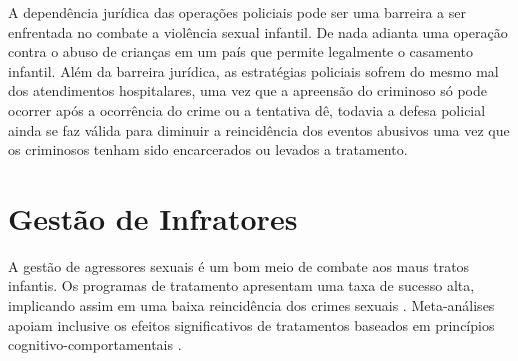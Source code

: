 A dependência jurídica das operações policiais pode ser uma barreira a ser enfrentada no combate a violência sexual infantil. De nada adianta uma operação contra o abuso de crianças em um país que permite legalmente o casamento infantil. Além da barreira jurídica, as estratégias policiais sofrem do mesmo mal dos atendimentos hospitalares, uma vez que a apreensão do criminoso só pode ocorrer após a ocorrência do crime ou a tentativa dê, todavia a defesa policial ainda se faz válida para diminuir a reincidência dos eventos abusivos uma vez que os criminosos tenham sido encarcerados ou levados a tratamento. 


%
%


\section{Gestão de Infratores}\label{sec:infratores}


A gestão de agressores sexuais é um bom meio de combate aos maus tratos infantis. Os programas de tratamento apresentam uma taxa de sucesso alta, implicando assim em uma baixa reincidência dos crimes sexuais \cite{ribeiro2018programas}. Meta-análises apoiam inclusive os efeitos significativos de tratamentos baseados em princípios cognitivo-comportamentais \cite{mendelson2015parent}.

